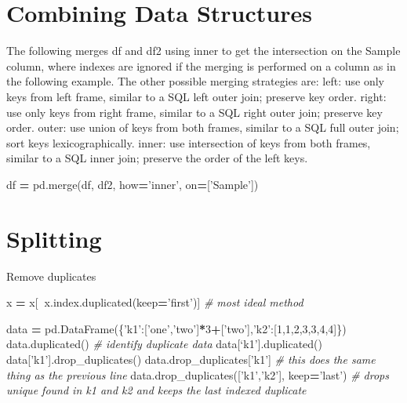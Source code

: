 \documentclass[]{book}
\newenvironment{Shaded}{\begin{snugshade}}{\end{snugshade}}
\newcommand{\DecValTok}[1]{\textcolor[rgb]{0.00,0.00,0.81}{#1}}
\newcommand{\StringTok}[1]{\textcolor[rgb]{0.31,0.60,0.02}{#1}}
\newcommand{\CommentTok}[1]{\textcolor[rgb]{0.56,0.35,0.01}{\textit{#1}}}
\newcommand{\OperatorTok}[1]{\textcolor[rgb]{0.81,0.36,0.00}{\textbf{#1}}}
\newcommand{\NormalTok}[1]{#1}
\begin{document}
\section{Combining Data Structures}\label{combining-data-structures}

The following merges df and df2 using inner to get the intersection on
the Sample column, where indexes are ignored if the merging is performed
on a column as in the following example. The other possible merging
strategies are: left: use only keys from left frame, similar to a SQL
left outer join; preserve key order. right: use only keys from right
frame, similar to a SQL right outer join; preserve key order. outer: use
union of keys from both frames, similar to a SQL full outer join; sort
keys lexicographically. inner: use intersection of keys from both
frames, similar to a SQL inner join; preserve the order of the left
keys.

\begin{Shaded}
\begin{Highlighting}[]
\NormalTok{df }\OperatorTok{=}\NormalTok{ pd.merge(df, df2, how}\OperatorTok{=}\StringTok{'inner'}\NormalTok{, on}\OperatorTok{=}\NormalTok{[}\StringTok{'Sample'}\NormalTok{])}
\end{Highlighting}
\end{Shaded}

\section{Splitting}\label{splitting}

Remove duplicates

\begin{Shaded}
\begin{Highlighting}[]
\NormalTok{x }\OperatorTok{=}\NormalTok{ x[}\OperatorTok{~}\NormalTok{x.index.duplicated(keep}\OperatorTok{=}\StringTok{'first'}\NormalTok{)] }\CommentTok{# most ideal method}

\NormalTok{data }\OperatorTok{=}\NormalTok{ pd.DataFrame(\{}\StringTok{'k1'}\NormalTok{:[}\StringTok{'one'}\NormalTok{,}\StringTok{'two'}\NormalTok{]}\OperatorTok{*}\DecValTok{3}\OperatorTok{+}\NormalTok{[}\StringTok{'two'}\NormalTok{],}\StringTok{'k2'}\NormalTok{:[}\DecValTok{1}\NormalTok{,}\DecValTok{1}\NormalTok{,}\DecValTok{2}\NormalTok{,}\DecValTok{3}\NormalTok{,}\DecValTok{3}\NormalTok{,}\DecValTok{4}\NormalTok{,}\DecValTok{4}\NormalTok{]\})}
\NormalTok{data.duplicated() }\CommentTok{# identify duplicate data}
\NormalTok{data[‘k1’].duplicated()}
\NormalTok{data[}\StringTok{'k1'}\NormalTok{].drop_duplicates()}
\NormalTok{data.drop_duplicates[}\StringTok{'k1'}\NormalTok{] }\CommentTok{# this does the same thing as the previous line}
\NormalTok{data.drop_duplicates([}\StringTok{'k1'}\NormalTok{,}\StringTok{'k2'}\NormalTok{], keep}\OperatorTok{=}\StringTok{'last'}\NormalTok{) }\CommentTok{# drops unique found in k1 and k2 and keeps the last indexed duplicate}
\end{Highlighting}
\end{Shaded}
\end{document}
